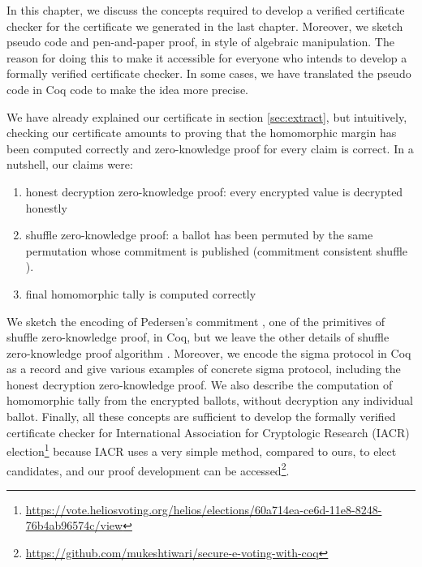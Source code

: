 In this chapter, we discuss the concepts required to develop a verified certificate checker for the certificate we generated 
in the last chapter.  Moreover, we sketch pseudo code and pen-and-paper proof, in style of algebraic manipulation.  
 The reason for doing this to make
it accessible for everyone who intends to develop a formally verified certificate checker.  
In some cases, we have translated the pseudo code in Coq code to make the idea more precise. 


We have already explained our certificate in section \ref{sec:extract}, 
but intuitively,  checking our certificate amounts to proving that  the homomorphic margin has been 
computed correctly and zero-knowledge proof for every claim is correct. In a nutshell, 
our claims were:
\begin{enumerate}
\item honest decryption zero-knowledge proof: every encrypted value is decrypted honestly 
\item shuffle zero-knowledge proof:
  a ballot has been permuted by the same permutation whose commitment is published (commitment consistent shuffle \citep{Wikstrom:2009:CPS}).
\item final homomorphic tally is computed correctly
\end{enumerate}


\noindent
We sketch the encoding of Pedersen's commitment \citep{Pederson}, one of the primitives of shuffle zero-knowledge proof, in Coq, 
but we leave the other details of shuffle zero-knowledge proof algorithm \citep{Wikstrom:2009:CPS}. Moreover, we
encode the sigma protocol in Coq as a record and give various examples of concrete sigma protocol, including 
the honest decryption zero-knowledge proof.   We also describe the computation of homomorphic tally from the encrypted 
ballots, without decryption any individual ballot.  Finally, all 
these concepts are sufficient to develop the formally verified 
certificate checker for International Association for Cryptologic Research (IACR) election\footnote{\url{https://vote.heliosvoting.org/helios/elections/60a714ea-ce6d-11e8-8248-76b4ab96574c/view}}
because IACR uses a very simple method, compared to ours, to elect candidates,  
and our proof development can be accessed\footnote{\url{https://github.com/mukeshtiwari/secure-e-voting-with-coq}}. 


